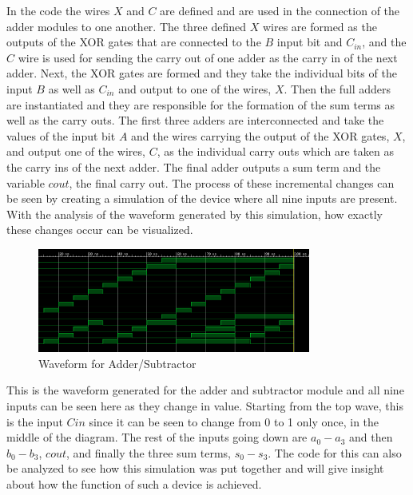 \documentclass[12pt]{article}
\begin{document}
    \par In the code the wires $X$ and $C$ are defined and are used in the
    connection of the adder modules to one another. The three defined $X$ wires
    are formed as the outputs of the XOR gates that are connected to the $B$
    input bit and $C_{in}$, and the $C$ wire is used for sending the carry out
    of one adder as the carry in of the next adder. Next, the XOR gates are
    formed and they take the individual bits of the input $B$ as well as
    $C_{in}$ and output to one of the wires, $X$. Then the full adders are
    instantiated and they are responsible for the formation of the sum terms as
    well as the carry outs. The first three adders are interconnected and take
    the values of the input bit $A$ and the wires carrying the output of the XOR
    gates, $X$, and output one of the wires, $C$, as the individual carry outs
    which are taken as the carry ins of the next adder. The final adder outputs
    a sum term and the variable $cout$, the final carry out. The process of
    these incremental changes can be seen by creating a simulation of the device
    where all nine inputs are present. With the analysis of the waveform
    generated by this simulation, how exactly these changes occur can be
    visualized.
    \begin{figure}[h]
        \centering
        \includegraphics[width=0.8\textwidth]{Waveform.png}
        \caption{Waveform for Adder/Subtractor}
        \label{fig:Waveform}
    \end{figure}
    \par This is the waveform generated for the adder and subtractor module and
    all nine inputs can be seen here as they change in value. Starting from the
    top wave, this is the input $Cin$ since it can be seen to change from 0 to 1
    only once, in the middle of the diagram. The rest of the inputs going down
    are $a_0-a_3$ and then $b_0-b_3$, $cout$, and finally the three sum terms,
    $s_0-s_3$. The code for this can also be analyzed to see how this simulation
    was put together and will give insight about how the function of such a
    device is achieved.
\end{document}
